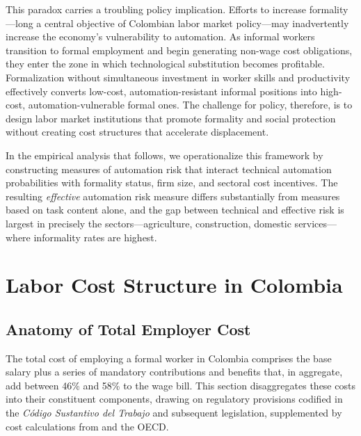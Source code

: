 \documentclass{article}
\begin{document}
This paradox carries a troubling policy implication. Efforts to increase formality---long a central objective of Colombian labor market policy---may inadvertently increase the economy's vulnerability to automation. As informal workers transition to formal employment and begin generating non-wage cost obligations, they enter the zone in which technological substitution becomes profitable. Formalization without simultaneous investment in worker skills and productivity effectively converts low-cost, automation-resistant informal positions into high-cost, automation-vulnerable formal ones. The challenge for policy, therefore, is to design labor market institutions that promote formality and social protection without creating cost structures that accelerate displacement.

In the empirical analysis that follows, we operationalize this framework by constructing measures of automation risk that interact technical automation probabilities with formality status, firm size, and sectoral cost incentives. The resulting \textit{effective} automation risk measure differs substantially from measures based on task content alone, and the gap between technical and effective risk is largest in precisely the sectors---agriculture, construction, domestic services---where informality rates are highest.


\section{Labor Cost Structure in Colombia}
\label{sec:labor_costs}

\subsection{Anatomy of Total Employer Cost}
\label{subsec:cost_anatomy}

The total cost of employing a formal worker in Colombia comprises the base salary plus a series of mandatory contributions and benefits that, in aggregate, add between 46\% and 58\% to the wage bill. This section disaggregates these costs into their constituent components, drawing on regulatory provisions codified in the \textit{C\'odigo Sustantivo del Trabajo} and subsequent legislation, supplemented by cost calculations from \cite{anif2018} and the OECD.
\end{document}
